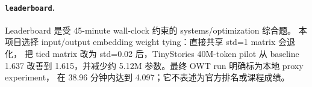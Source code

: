 \paragraph{\texttt{leaderboard}.}
Leaderboard 是受 45-minute wall-clock 约束的 systems/optimization 综合题。
本项目选择 input/output embedding weight tying：直接共享 std=1 matrix 会退化，
把 tied matrix 改为 std=0.02 后，TinyStories 40M-token pilot 从 baseline 1.637
改善到 1.615，并减少约 5.12M 参数。最终 OWT run 明确标为本地 proxy experiment，
在 38.96 分钟内达到 4.097；它不表述为官方排名或课程成绩。
